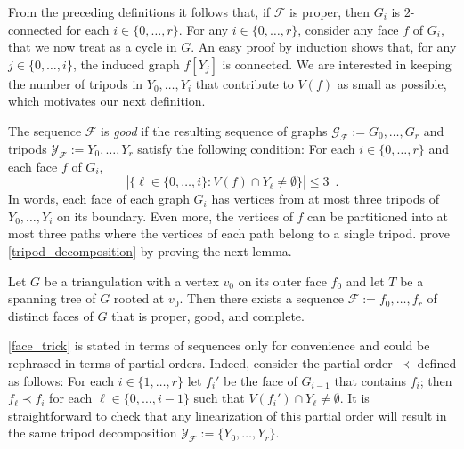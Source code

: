 \documentclass{patmorin}
\begin{document}
From the preceding definitions it follows that, if $\mathcal{F}$ is proper, then  $G_i$ is $2$-connected for each $i\in\{0,\ldots,r\}$.  For any $i\in\{0,\ldots,r\}$, consider any face $f$ of $G_i$, that we now treat as a cycle in $G$.  An easy proof by induction shows that, for any $j\in\{0,\ldots,i\}$, the induced graph $f[Y_j]$ is connected. %
We are interested in keeping the number of tripods in $Y_0,\ldots,Y_i$ that contribute to $V(f)$ as small as possible, which motivates our next definition.

The sequence $\mathcal{F}$ is \emph{good} if the resulting sequence of graphs $\mathcal{G}_\mathcal{F}:=G_0,\ldots,G_r$ and tripods $\mathcal{Y}_\mathcal{F}:=Y_0,\ldots,Y_r$ satisfy the following condition:  For each $i\in\{0,\ldots, r\}$ and each face $f$ of $G_i$,
\[
   |\{\ell\in\{0,\ldots,i\}: V(f)\cap Y_{\ell}\neq\emptyset\}|\le 3 \enspace .
\]
In words, each face of each graph $G_i$ has vertices from at most three tripods of $Y_0,\ldots,Y_i$ on its boundary.  Even more, the vertices of $f$ can be partitioned into at most three paths where the vertices of each path belong to a single tripod. \citet{dujmovic.joret.ea:planar} prove \cref{tripod_decomposition} by proving the next lemma.


\begin{lem}\label{face_trick}
  Let $G$ be a triangulation with a vertex $v_0$ on its outer face $f_0$ and let $T$ be a spanning tree of $G$ rooted at $v_0$.  Then there exists a sequence $\mathcal{F}:=f_0,\ldots,f_{r}$ of distinct faces of $G$ that is proper, good, and complete.
\end{lem}

\begin{rem}
  \cref{face_trick} is stated in terms of sequences only for convenience and could be rephrased in terms of partial orders. Indeed, consider the partial order $\prec$ defined as follows:  For each $i\in\{1,\ldots,r\}$ let $f_i'$ be the face of $G_{i-1}$ that contains $f_i$; then $f_\ell\prec f_i$ for each $\ell\in\{0,\ldots,i-1\}$ such that $V(f_i')\cap Y_\ell\neq\emptyset$.  It is straightforward to check that any linearization of this partial order will result in the same tripod decomposition $\mathcal{Y_F}:=\{Y_0,\ldots,Y_{r}\}$.
\end{rem}
\end{document}
